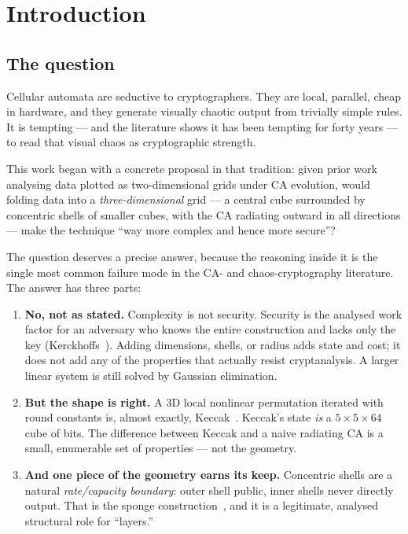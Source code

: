 \documentclass[11pt,a4paper]{article}
\theoremstyle{plain}
\theoremstyle{definition}
\theoremstyle{remark}
\begin{document}
\tableofcontents

\section{Introduction}

\subsection{The question}

Cellular automata are seductive to cryptographers. They are local, parallel, cheap in
hardware, and they generate visually chaotic output from trivially simple rules. It
is tempting --- and the literature shows it has been tempting for forty years --- to
read that visual chaos as cryptographic strength.

This work began with a concrete proposal in that tradition: given prior work
analysing data plotted as two-dimensional grids under CA evolution, would folding
data into a \emph{three-dimensional} grid --- a central cube surrounded by concentric
shells of smaller cubes, with the CA radiating outward in all directions --- make the
technique ``way more complex and hence more secure''?

The question deserves a precise answer, because the reasoning inside it is the single
most common failure mode in the CA- and chaos-cryptography literature. The answer has
three parts:

\begin{enumerate}
  \item \textbf{No, not as stated.} Complexity is not security. Security is the
    analysed work factor for an adversary who knows the entire construction and lacks
    only the key (Kerckhoffs~\cite{kerckhoffs}). Adding dimensions, shells, or radius
    adds state and cost; it does not add any of the properties that actually resist
    cryptanalysis. A larger linear system is still solved by Gaussian elimination.
  \item \textbf{But the shape is right.} A 3D local nonlinear permutation iterated
    with round constants is, almost exactly, Keccak~\cite{keccak}. Keccak's state
    \emph{is} a $5\times5\times64$ cube of bits. The difference between Keccak and a
    naive radiating CA is a small, enumerable set of properties --- not the geometry.
  \item \textbf{And one piece of the geometry earns its keep.} Concentric shells are
    a natural \emph{rate/capacity boundary}: outer shell public, inner shells never
    directly output. That is the sponge construction~\cite{spongeindiff}, and it is a
    legitimate, analysed structural role for ``layers.''
\end{enumerate}
\end{document}
